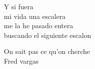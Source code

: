 

Y si fuera \\
mi vida una escalera \\
me la he pasado entera \\
buscando el siguiente escalon

\vspace{5in}


On sait pas ce qu'on cherche \\
Fred vargas